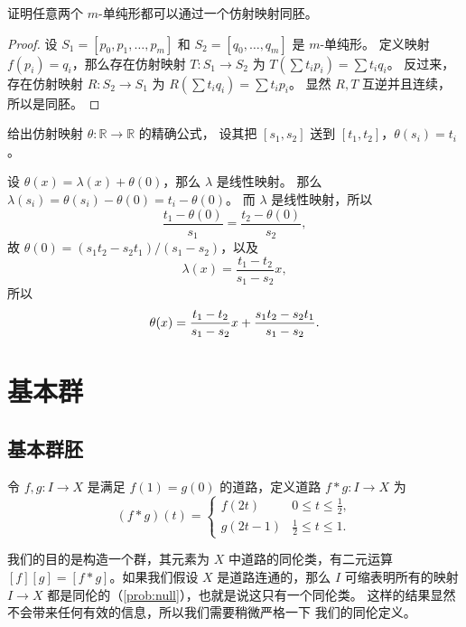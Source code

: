 \documentclass[fontset=none]{Notes}
\begin{document}
\begin{problem}{}{}
  证明任意两个 $m$-单纯形都可以通过一个仿射映射同胚。
\end{problem}
\begin{proof}
  设 $S_1=[p_0,p_1,\dots,p_m]$ 和 $S_2=[q_0,\dots,q_m]$ 是 $m$-单纯形。
  定义映射 $f(p_i)=q_i$，那么存在仿射映射
  $T:S_1\to S_2$ 为 $T(\sum t_ip_i)=\sum t_iq_i$。
  反过来，存在仿射映射 $R:S_2\to S_1$ 为 $R(\sum t_iq_i)=\sum t_ip_i$。
  显然 $R,T$ 互逆并且连续，所以是同胚。
\end{proof}

\begin{problem}{}{}
  给出仿射映射 $\theta:\mathbb{R}\to \mathbb{R}$ 的精确公式，
  设其把 $[s_1,s_2]$ 送到 $[t_1,t_2]$，$\theta(s_i)=t_i$。
\end{problem}
\begin{solution}
  设 $\theta(x)=\lambda(x)+\theta(0)$，那么 $\lambda$ 是线性映射。
  那么 $\lambda(s_i)=\theta(s_i)-\theta(0)=t_i-\theta(0)$。
  而 $\lambda$ 是线性映射，所以
  \[
    \frac{t_1-\theta(0)}{s_1}=\frac{t_2-\theta(0)}{s_2},
  \]
  故 $\theta(0)=(s_1t_2-s_2t_1)/(s_1-s_2)$，以及
  \[
    \lambda(x)=\frac{t_1-t_2}{s_1-s_2}x,
  \]
  所以
  \[
    \theta(x)=\frac{t_1-t_2}{s_1-s_2}x+\frac{s_1t_2-s_2t_1}{s_1-s_2}.\qedhere
  \]
\end{solution}

\chapter{基本群}

\section{基本群胚}

\begin{definition}
  令 $f,g:I\to X$ 是满足 $f(1)=g(0)$ 的道路，定义道路 $f*g:I\to X$
  为
  \[
    (f*g)(t)=\begin{cases}
      f(2t) & 0\leq t\leq\frac{1}{2},\\
      g(2t-1) & \frac{1}{2}\leq t\leq 1.
    \end{cases}
  \]
\end{definition}

我们的目的是构造一个群，其元素为 $X$ 中道路的同伦类，有二元运算
$[f][g]=[f*g]$。如果我们假设 $X$ 是道路连通的，那么 $I$ 可缩表明所有的映射
$I\to X$ 都是同伦的（\ref{prob:null}），也就是说这只有一个同伦类。
这样的结果显然不会带来任何有效的信息，所以我们需要稍微严格一下
我们的同伦定义。
\end{document}
